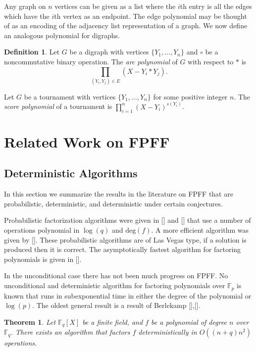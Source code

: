 \documentclass{article}
\let\chapter\section
\newcounter{dummy} \numberwithin{dummy}{section}
\theoremstyle{plain}
\newtheorem{thm}[dummy]{Theorem}
\theoremstyle{definition}
\newtheorem{mydef}[dummy]{Definition}
\def\Fp {{ \mathbb{F} _ {p} }}
\def\Fq {{ \mathbb{F} _ {q} }}
\def\deg {{ \mathrm{deg}}}
\begin{document}
        Any graph on $n$ vertices can be given as a list where the $i$th entry is all the edges which have the $i$th vertex as an endpoint. The edge polynomial may be thought of as an encoding of the adjacency list representation of a graph. We now define an analogous polynomial for digraphs. 
				
				\begin{mydef}
				\label{DEF:arcpoly}
				    Let $G$ be a digraph with vertices $\{Y_1,\ldots,Y_n \}$ and $\circ$ be a noncommutative binary operation. The \emph{arc polynomial} of $G$ with respect to $\ast$ is 
            \[
                \prod_{(Y_i,Y_j) \in E}{(X-Y_i \ast Y_j)}.
            \]
        \end{mydef} 

        Let $G$ be a tournament with vertices $\{Y_1,\ldots,Y_n \}$ for some positive integer $n$. The \emph{score polynomial} of a tournament is $ \prod_{i=1}^n{(X-Y_i)}^{s(Y_i)} $.  
%
%
\newpage
\chapter{Related Work on FPFF}
\label{CH:rFPFF}
%
%			
    \subsection{Deterministic Algorithms}
		\label{SEC:DETALG}
        In this section we summarize the results in the literature on FPFF that are probabilistic, deterministic, and deterministic under certain conjectures. 
		
		    Probabilistic factorization algorithms were given in [] and [] that use a number of operations polynomial in $\log(q)$ and $\deg(f)$. A more efficient algorithm was given by []. These probabilistic algorithms are of Las Vegas type, if a solution is produced then it is correct. The asymptotically fastest algorithm for factoring polynomials is given in [].
		
		    In the unconditional case there has not been much progress on FPFF. No unconditional and deterministic algorithm for factoring polynomials over $\Fp$ is known that runs in subexponential time in either the degree of the polynomial or $\log(p)$. The oldest general result is a result of Berlekamp [],[].
				
				\begin{thm}
				\label{THM:berleFac}
				    Let $\Fq[X]$ be a finite field, and $f$ be a polynomial of degree $n$ over $\Fq$. There exists an algorithm that factors $f$ deterministically in $O((n + q) n^2)$ operations.
				\end{thm}
				
\end{document}
